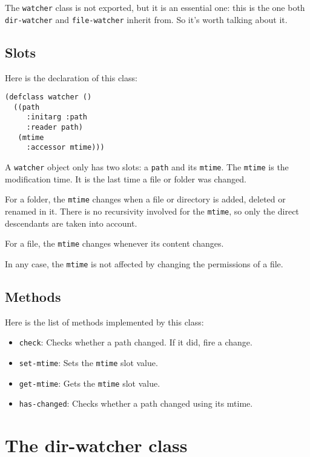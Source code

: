\documentclass[a4paper]{report}
\newcommand{\code}{\texttt}
\begin{document}
The \code{watcher} class is not exported, but it is an essential one: this is
the one both \code{dir-watcher} and \code{file-watcher} inherit from. So it's
worth talking about it.

\subsection{Slots}

Here is the declaration of this class:

\begin{verbatim}
(defclass watcher ()
  ((path
     :initarg :path
     :reader path)
   (mtime
     :accessor mtime)))
\end{verbatim}

A \code{watcher} object only has two slots: a \code{path} and its \code{mtime}.
The \code{mtime} is the modification time. It is the last time a file or folder
was changed.

For a folder, the \code{mtime} changes when a file or directory is added,
deleted or renamed in it. There is no recursivity involved for the \code{mtime},
so only the direct descendants are taken into account.

For a file, the \code{mtime} changes whenever its content changes.

In any case, the \code{mtime} is not affected by changing the permissions of a
file.

\subsection{Methods}

Here is the list of methods implemented by this class:

\begin{itemize}
    \item \code{check}: Checks whether a path changed. If it did, fire a change.
    \item \code{set-mtime}: Sets the \code{mtime} slot value.
    \item \code{get-mtime}: Gets the \code{mtime} slot value.
    \item \code{has-changed}: Checks whether a path changed using its mtime.
\end{itemize}

\section{The dir-watcher class}
\end{document}
